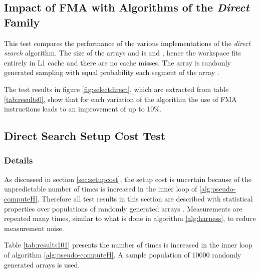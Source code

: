 \documentclass[preprint,1p,times]{elsarticle}
\begin{document}
\subsection{Impact of FMA with Algorithms of the \textit{Direct} Family}
\label{sec:testFMA}
This test compares the performance of the various implementations of the \textit{direct search} algorithm.
The size of the arrays  and  is  and , hence the workspace fits entirely in L1 cache and there are no cache misses. 
The array  is randomly generated sampling with equal probability each segment of the array .

The test results in figure \ref{fig:selectdirect}, which are extracted from table \ref{tab:results0}, show  
that for each variation of the algorithm the use of FMA instructions leads to an improvement of up to 10\%.

\subsection{Direct Search Setup Cost Test}
\label{sec:setuptests}
\subsubsection{Details}
As discussed in section \ref{sec:setupcost}, the setup cost is uncertain because of the unpredictable number of times  is increased in the inner loop of \ref{alg:pseudo-computeH}. Therefore all test results in this section are described with statistical properties over populations of randomly generated arrays . Measurements are repeated many times, similar to what is done in algorithm \ref{alg:harness}, to reduce measurement noise.

Table \ref{tab:results101} presents the number of times  is increased in the inner loop of algorithm \ref{alg:pseudo-computeH}. A sample population of 10000 randomly generated arrays  is used.
\end{document}
